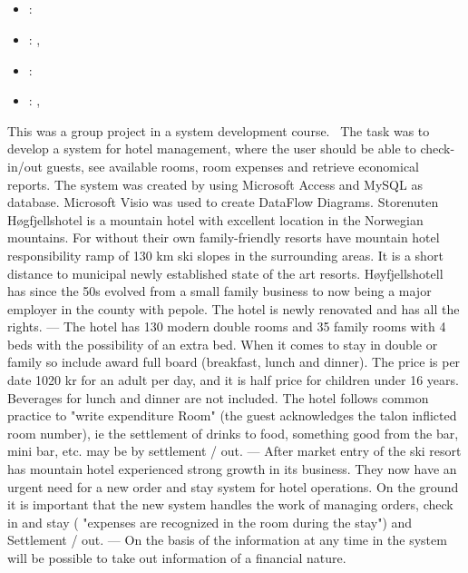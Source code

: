 \subsection[System Developing Project]{}
\label{sec:inf165_sys_dev}
\begin{itemize} 
	\item {}: 
	\item {}: , 
	\item {}: 
	\item {}: , 
\end{itemize} 
This was a group project in a system development course. 
The task was to develop a system for hotel management, where the user should be able to check-in/out guests, see available rooms, room expenses and retrieve economical reports.
The system was created by using Microsoft Access and MySQL as database. Microsoft Visio was used to create DataFlow Diagrams.
\vspace{0.5em}\newline
Storenuten Høgfjellshotel is a mountain hotel with excellent location in the Norwegian mountains. 
For without their own family-friendly resorts have mountain hotel responsibility ramp of 130 km ski slopes in the surrounding areas. 
It is a short distance to municipal newly established state of the art resorts. 
Høyfjellshotell has since the 50s evolved from a small family business to now being a major employer in the county with pepole. 
The hotel is newly renovated and has all the rights. 
---
The hotel has 130 modern double rooms and 35 family rooms with 4 beds with the possibility of an extra bed. 
When it comes to stay in double or family so include award full board (breakfast, lunch and dinner). 
The price is per date 1020 kr for an adult per day, and it is half price for children under 16 years. 
Beverages for lunch and dinner are not included. 
The hotel follows common practice to "write expenditure Room" (the guest acknowledges the talon inflicted room number), 
ie the settlement of drinks to food, something good from the bar, mini bar, etc. may be by settlement / out.
---
After market entry of the ski resort has mountain hotel experienced strong growth in its business.
They now have an urgent need for a new order and stay system for hotel operations. 
On the ground it is important that the new system handles the work of managing orders, check in and stay ( "expenses are recognized in the room during the stay") and Settlement / out.
---
On the basis of the information at any time in the system will be possible to take out information of a financial nature.

